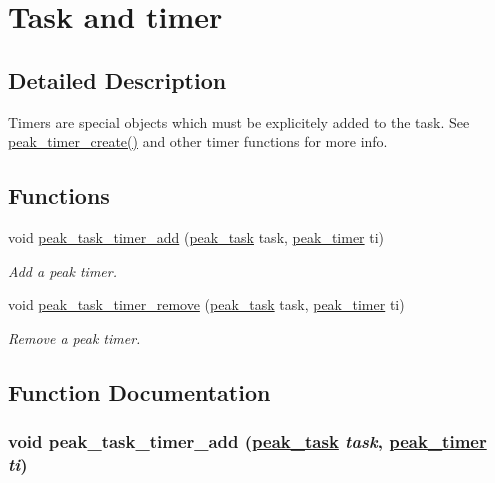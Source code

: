 \hypertarget{group__task__timer}{
\section{Task and timer}
\label{group__task__timer}
}


\subsection{Detailed Description}
Timers are special objects which must be explicitely added to the task. See \hyperlink{group__timer_ga9}{peak\_\-timer\_\-create()} and other timer functions for more info. 

\subsection*{Functions}
\begin{CompactItemize}
\item 
void \hyperlink{group__task__timer_ga0}{peak\_\-task\_\-timer\_\-add} (\hyperlink{group__task__common_ga0}{peak\_\-task} task, \hyperlink{group__timer_ga0}{peak\_\-timer} ti)
\begin{CompactList}\small\item\em Add a peak timer. \item\end{CompactList}\item 
void \hyperlink{group__task__timer_ga1}{peak\_\-task\_\-timer\_\-remove} (\hyperlink{group__task__common_ga0}{peak\_\-task} task, \hyperlink{group__timer_ga0}{peak\_\-timer} ti)
\begin{CompactList}\small\item\em Remove a peak timer. \item\end{CompactList}\end{CompactItemize}


\subsection{Function Documentation}
\hypertarget{group__task__timer_ga0}{
\subsubsection[peak\_\-task\_\-timer\_\-add]{\setlength{\rightskip}{0pt plus 5cm}void peak\_\-task\_\-timer\_\-add (\hyperlink{group__task__common_ga0}{peak\_\-task} {\em task}, \hyperlink{group__timer_ga0}{peak\_\-timer} {\em ti})}}
\label{group__task__timer_ga0}



